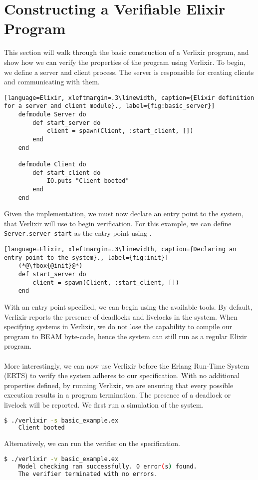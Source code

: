 \section{Constructing a Verifiable Elixir Program} \label{sec:verifiable}
This section will walk through the basic construction of a Verlixir program, and show how we can verify the properties of the program using Verlixir. To begin, we define a server and client process. The server is responsible for creating clients and communicating with them. 
\begin{lstlisting}[language=Elixir, xleftmargin=.3\linewidth, caption={Elixir definition for a server and client module}., label={fig:basic_server}]
    defmodule Server do
        def start_server do
            client = spawn(Client, :start_client, [])
        end
    end

    defmodule Client do
        def start_client do
            IO.puts "Client booted"
        end
    end
\end{lstlisting}
Given the implementation, we must now declare an entry point to the system, that Verlixir will use to begin verification. For this example, we can define \texttt{Server.server\_start} as the entry point using \textbf{\@init}.

\begin{lstlisting}[language=Elixir, xleftmargin=.3\linewidth, caption={Declaring an entry point to the system}., label={fig:init}]
    (*@\fbox{@init}@*)
    def start_server do
        client = spawn(Client, :start_client, [])
    end
\end{lstlisting}
With an entry point specified, we can begin using the available tools. By default, Verlixir reports the presence of deadlocks and livelocks in the system. When specifying systems in Verlixir, we do not lose the capability to compile our program to BEAM byte-code, hence the system can still run as a regular Elixir program.
\\ \\
More interestingly, we can now use Verlixir before the Erlang Run-Time System (ERTS) to verify the system adheres to our specification. With no additional properties defined, by running Verlixir, we are ensuring that every possible execution results in a program termination. The presence of a deadlock or livelock will be reported. We first run a simulation of the system.
\begin{lstlisting}[language=bash, xleftmargin=.3\linewidth]
    $ ./verlixir -s basic_example.ex 
    Client booted
\end{lstlisting}
Alternatively, we can run the verifier on the specification.
\begin{lstlisting}[language=bash, xleftmargin=.3\linewidth]
    $ ./verlixir -v basic_example.ex 
    Model checking ran successfully. 0 error(s) found.
    The verifier terminated with no errors.
\end{lstlisting}
